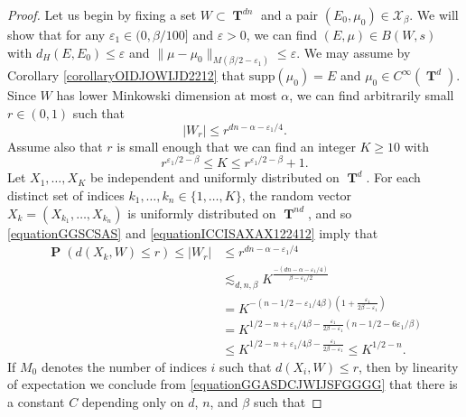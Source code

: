 \documentclass[12pt,reqno]{article}
\numberwithin{equation}{section}
\DeclareMathOperator{\TT}{\mathbf{T}}
\DeclareMathOperator{\PP}{\mathbf{P}}
\begin{document}
\begin{proof}
    Let us begin by fixing a set $W \subset \TT^{dn}$ and a pair $(E_0,\mu_0) \in \mathcal{X}_\beta$. We will show that for any $\varepsilon_1 \in (0,\beta/100]$ and $\varepsilon > 0$, we can find $(E,\mu) \in B(W,s)$ with $d_H(E,E_0) \leq \varepsilon$ and $\| \mu - \mu_0 \|_{M(\beta/2 - \varepsilon_1)} \leq \varepsilon$. We may assume by Corollary \ref{corollaryOIDJOWIJD2212} that $\text{supp}(\mu_0) = E$ and $\mu_0 \in C^\infty(\TT^d)$. Since $W$ has lower Minkowski dimension at most $\alpha$, we can find arbitrarily small $r \in (0,1)$ such that
    \begin{equation} \label{equationGGSCSAS}
        |W_r| \leq r^{dn - \alpha - \varepsilon_1/4}.
    \end{equation}
    Assume also that $r$ is small enough that we can find an integer $K \geq 10$ with
    \begin{equation} \label{equationICCISAXAX122412}
        r^{\varepsilon_1/2 - \beta} \leq K \leq r^{\varepsilon_1/2 - \beta} + 1.
    \end{equation}
    Let $X_1, \dots, X_K$ be independent and uniformly distributed on $\TT^d$. For each distinct set of indices $k_1, \dots, k_n \in \{ 1, \dots, K \}$, the random vector $X_k = (X_{k_1}, \dots, X_{k_n})$ is uniformly distributed on $\TT^{nd}$, and so \eqref{equationGGSCSAS} and \eqref{equationICCISAXAX122412} imply that
    \begin{equation} \label{equationGGASDCJWIJSFGGGG}
    \begin{split}
        \PP(d(X_k,W) \leq r) \leq |W_{r}| &\leq r^{dn - \alpha - \varepsilon_1/4}\\
        &\lesssim_{d,n,\beta} K^{\frac{-(dn - \alpha - \varepsilon_1/4)}{\beta - \varepsilon_1/2}}\\
        &= K^{- \left( n - 1/2 - \varepsilon_1 / 4 \beta \right) \left( 1 + \frac{\varepsilon_1}{2\beta - \varepsilon_1} \right)}\\
        &= K^{1/2 - n + \varepsilon_1 / 4\beta - \frac{\varepsilon_1}{2\beta - \varepsilon_1}\left( n - 1/2 - 6\varepsilon_1/\beta \right)}\\
        &\leq K^{1/2 - n + \varepsilon_1/4\beta - \frac{\varepsilon_1}{2\beta - \varepsilon_1}} \leq K^{1/2 - n}.
    \end{split}
    \end{equation}
    If $M_0$ denotes the number of indices $i$ such that $d(X_i,W) \leq r$, then by linearity of expectation we conclude from \eqref{equationGGASDCJWIJSFGGGG} that there is a constant $C$ depending only on $d$, $n$, and $\beta$ such that

\end{proof}
\end{document}
